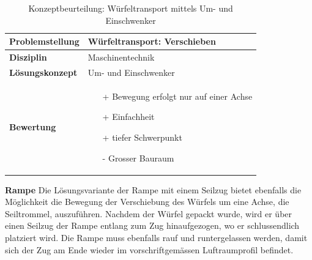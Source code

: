 \documentclass[../../main.tex]{subfiles}
\begin{document}
\begin{flushleft}
    \begin{table}[h]
    \begin{tabular}{ | l | p{11cm} |}
    \hline
    \textbf{Problemstellung} & Würfeltransport: Verschieben \\ \hline
    \textbf{Disziplin} & Maschinentechnik \\ \hline
    \textbf{Lösungskonzept} &  Um- und Einschwenker \\ \hline
    \textbf{Bewertung} &  \begin{itemize}
                            \item[+] Bewegung erfolgt nur auf einer Achse
                            \item[+] Einfachheit
                            \item[+] tiefer Schwerpunkt
                            \item[-] Grosser Bauraum
                          \end{itemize} \\ \hline
    \end{tabular}
    \caption{Konzeptbeurteilung: Würfeltransport mittels Um- und Einschwenker}
    \label{tab:konzept_wurfeltrransport_umschwenker}
\end{table}
\end{flushleft}
\textbf{Rampe}
Die Lösungsvariante der Rampe mit einem Seilzug bietet ebenfalls die Möglichkeit die Bewegung der Verschiebung des Würfels um eine Achse, die Seiltrommel, auszuführen. Nachdem der Würfel gepackt wurde, wird er über einen Seilzug der Rampe entlang zum Zug hinaufgezogen, wo er schlussendlich platziert wird. Die Rampe muss ebenfalls rauf und runtergelassen werden, damit sich der Zug am Ende wieder im vorschriftgemässen Luftraumprofil befindet.
\end{document}

